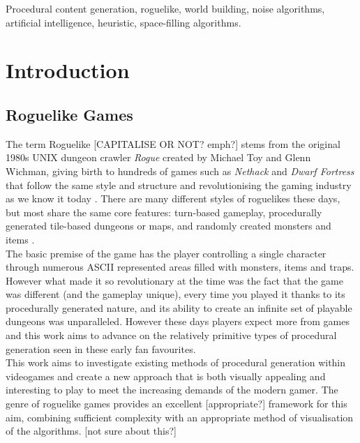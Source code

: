 \documentclass[12pt,a4paper]{article}
\begin{document}

\begin{keywords}
Procedural content generation, roguelike, world building, noise algorithms, artificial intelligence, heuristic, space-filling algorithms.
\end{keywords}

\section{Introduction}


\subsection{Roguelike Games}

The term Roguelike [CAPITALISE OR NOT? emph?] stems from the original 1980s UNIX dungeon crawler \emph{Rogue} created by Michael Toy and Glenn Wichman, giving birth to hundreds of games such as \emph{Nethack} and \emph{Dwarf Fortress} that follow the same style and structure and revolutionising the gaming industry as we know it today \cite{Dunhack}. There are many different styles of roguelikes these days, but most share the same core features: turn-based gameplay, procedurally generated tile-based dungeons or maps, and randomly created monsters and items \cite{pgcbook}. \\


The basic premise of the game has the player controlling a single character through numerous ASCII represented areas filled with monsters, items and traps. However what made it so revolutionary at the time was the fact that the game was different (and the gameplay unique), every time you played it thanks to its procedurally generated nature, and its ability to create an infinite set of playable dungeons was unparalleled\cite{platformgames}. However these days players expect more from games and this work aims to advance on the relatively primitive types of procedural generation seen in these early fan favourites. \\


This work aims to investigate existing methods of procedural generation within videogames and create a new approach that is both visually appealing and interesting to play to meet the increasing demands of the modern gamer. The genre of roguelike games provides an excellent [appropriate?] framework for this aim, combining sufficient complexity with an appropriate method of visualisation of the algorithms. [not sure about this?]
\end{document}
